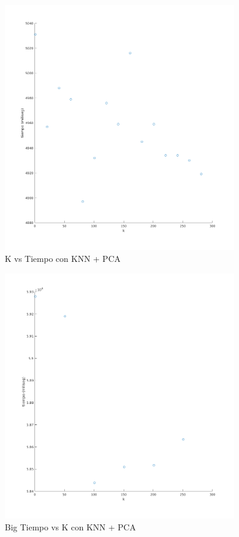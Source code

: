 \begin{figure}[H]
	\centering	\includegraphics[width=0.9\textwidth]{img/k_pca_tiempo.png}
	\caption{K vs Tiempo con KNN + PCA}
	\label{fig:K vs Tiempo con KNN + PCA}
\end{figure}
\begin{figure}[H]
	\centering	\includegraphics[width=0.9\textwidth]{img/big_k_pca_tiempo.png}
	\caption{Big Tiempo vs K con KNN + PCA}
	\label{fig:Big K vs Tiempo con KNN + PCA}
\end{figure}



